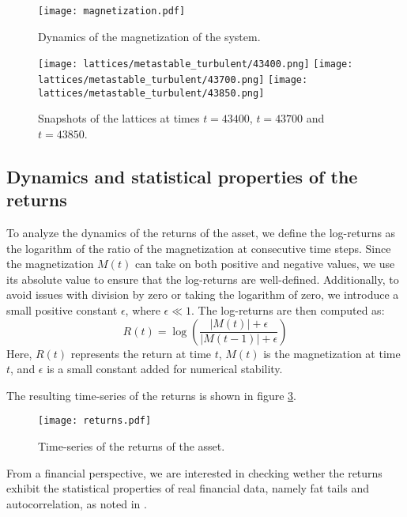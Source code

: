 \begin{figure}[H]
    \centering
    \texttt{[image: magnetization.pdf]}
    \caption{Dynamics of the magnetization of the system.}
    \label{fig:magnetization}
\end{figure}

\begin{figure}[H]
    \centering
    \texttt{[image: lattices/metastable\_turbulent/43400.png]}
    \texttt{[image: lattices/metastable\_turbulent/43700.png]}
    \texttt{[image: lattices/metastable\_turbulent/43850.png]}
    \caption{Snapshots of the lattices at times $t=43400$, $t=43700$ and $t=43850$.}
    \label{fig:lattices}
\end{figure}

\subsection{Dynamics and statistical properties of the returns}
To analyze the dynamics of the returns of the asset, we define the log-returns as the logarithm of the ratio of the magnetization at consecutive time steps. Since the magnetization $M(t)$ can take on both positive and negative values, we use its absolute value to ensure that the log-returns are well-defined. Additionally, to avoid issues with division by zero or taking the logarithm of zero, we introduce a small positive constant $\epsilon$, where $\epsilon \ll 1$. The log-returns are then computed as:
\begin{equation}
    R(t) = \log\left(\frac{|M(t)| + \epsilon}{|M(t-1)| + \epsilon}\right)
\end{equation}
Here, $R(t)$ represents the return at time $t$, $M(t)$ is the magnetization at time $t$, and $\epsilon$ is a small constant added for numerical stability.

The resulting time-series of the returns is shown in figure \ref{fig:returns}.

\begin{figure}[H]
    \centering
    \texttt{[image: returns.pdf]}
    \caption{Time-series of the returns of the asset.}
    \label{fig:returns}
\end{figure}

From a financial perspective, we are interested in checking wether the returns exhibit the statistical properties of real financial data, namely fat tails and autocorrelation, as noted in \cite{bouchaud2000theory}.

